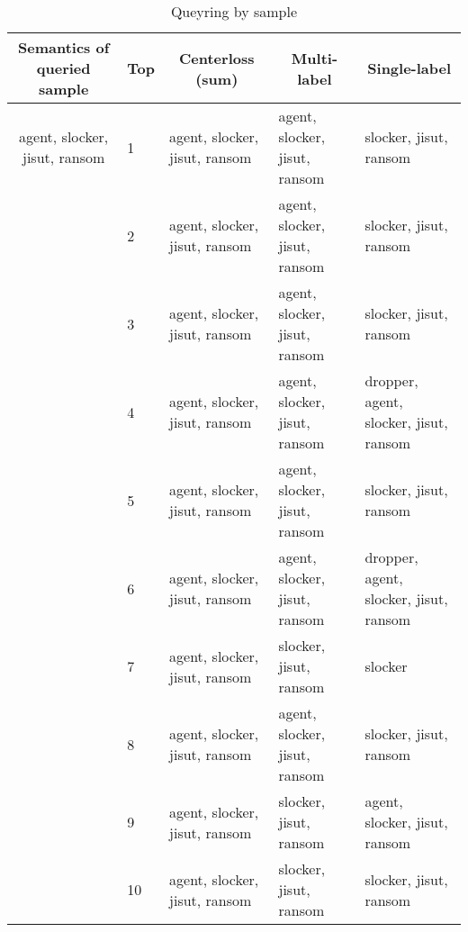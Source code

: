 \begin{table*}%
\caption{Queyring by sample}
\label{tab:sample_query_result}
\begin{minipage}{\textwidth}
\begin{center}
\begin{tabular}{@{}lllll@{}}
\toprule
\multicolumn{1}{c}{Semantics of queried sample}   & Top & \multicolumn{1}{c}{Centerloss (sum)} & \multicolumn{1}{c}{Multi-label}     & \multicolumn{1}{c}{Single-label}             \\ \midrule
\multicolumn{1}{c}{agent, slocker, jisut, ransom} & 1   & agent, slocker, jisut, ransom  & agent, slocker, jisut, ransom & slocker, jisut, ransom                 \\
                                                  & 2   & agent, slocker, jisut, ransom  & agent, slocker, jisut, ransom & slocker, jisut, ransom                 \\
                                                  & 3   & agent, slocker, jisut, ransom  & agent, slocker, jisut, ransom & slocker, jisut, ransom                 \\
                                                  & 4   & agent, slocker, jisut, ransom  & agent, slocker, jisut, ransom & dropper, agent, slocker, jisut, ransom \\
                                                  & 5   & agent, slocker, jisut, ransom  & agent, slocker, jisut, ransom & slocker, jisut, ransom                 \\
                                                  & 6   & agent, slocker, jisut, ransom  & agent, slocker, jisut, ransom & dropper, agent, slocker, jisut, ransom \\
                                                  & 7   & agent, slocker, jisut, ransom  & slocker, jisut, ransom        & slocker                                \\
                                                  & 8   & agent, slocker, jisut, ransom  & agent, slocker, jisut, ransom & slocker, jisut, ransom                 \\
                                                  & 9   & agent, slocker, jisut, ransom  & slocker, jisut, ransom        & agent, slocker, jisut, ransom          \\
                                                  & 10  & agent, slocker, jisut, ransom  & slocker, jisut, ransom        & slocker, jisut, ransom                 \\ \bottomrule
\end{tabular}
\end{center}
\bigskip\centering
\end{minipage}
\end{table*}%

